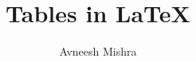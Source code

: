 

\title{Tables in \LaTeX}
\author{Avneesh Mishra}


    \maketitle
    \tableofcontents
    \listoftables
    \pagebreak
    

